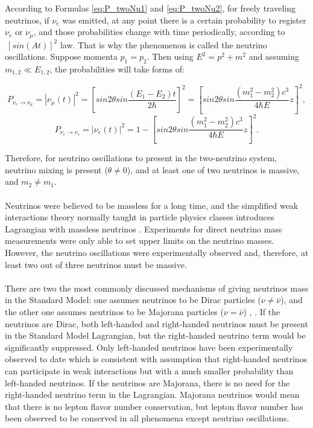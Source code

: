 According to Formulas \ref{eq:P_twoNu1} and \ref{eq:P_twoNu2}, for freely traveling neutrinos, if $\nu_e$ was emitted, at any point there is a certain probability to register $\nu_e$ or $\nu_\mu$, and those probabilities change with time periodically, according to $~[sin(At)]^2$ law. That is why the phenomenon is called the neutrino oscillations.
Suppose momenta $p_1=p_2$. Then using $E^2=p^2+m^2$ and assuming $m_{1,2}\ll E_{1,2}$, the probabilities will take forms of:\\
\begin{center}
\begin{equation}
\label{eq:P_twoNu3}
P_{\nu_e \rightarrow \nu_\mu}=|\nu_\mu(t)|^2=[{sin2\theta}sin{\frac{(E_1-E_2)t}{2\hbar}}]^2=[{sin2\theta}sin{\frac{(m_1^2-m_2^2)c^3}{4\hbar{E}}z}]^2,
\end{equation}
\begin{equation}
\label{eq:P_twoNu4}
P_{\nu_e \rightarrow \nu_e}=|\nu_e(t)|^2=1-[{sin2\theta}sin{\frac{(m_1^2-m_2^2)c^3}{4\hbar{E}}z}]^2.
\end{equation}
\end{center}
Therefore, for neutrino oscillations to present in the two-neutrino system,  neutrino mixing is present ($\theta \neq 0$), and at least one of two neutrinos is massive, and $m_2 \neq m_1$.\\ \\
Neutrinos were believed to be massless for a long time, and the simplified weak interactions theory normally taught in particle physics classes introduces Lagrangian with massless neutrinos \cite{ref_Griffiths}. Experiments for direct neutrino mass measurements were only able to set upper limits on the neutrino masses. However, the neutrino oscillations were experimentally observed and, therefore, at least two out of three neutrinos must be massive. \\ \\
There are two the most commonly discussed mechanisms of giving neutrinos mass in the Standard Model: one assumes neutrinos to be Dirac particles ($\nu \neq \bar{\nu}$), and the other one assumes neutrinos to be Majorana particles ($\nu = \bar{\nu}$) \cite{ref_PDG}, \cite{ref_theory_Osc}. If the neutrinos are Dirac, both left-handed and right-handed neutrinos must be present in the Standard Model Lagrangian, but the right-handed neutrino term would be significantly suppressed. Only left-handed neutrinos have been experimentally observed to date which is consistent with assumption that right-handed neutrinos can participate in weak interactions but with a much smaller probability than left-handed neutrinos. If the neutrinos are Majorana, there is no need for the right-handed neutrino term in the Lagrangian. Majorana neutrinos would mean that there is no lepton flavor number conservation, but lepton flavor number has been observed to be conserved in all phenomena except neutrino oscillations. \\ \\
